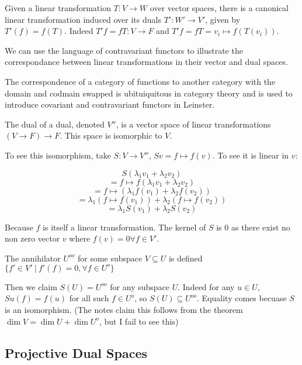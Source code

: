 \documentclass[10pt]{article}
\begin{document}
Given a linear transformation $T: V \to W$ over vector spaces, there is a
canonical linear transformation induced over its duals $T': W' \to V'$,
given by $T'(f) = f(T)$. Indeed $T'f = fT: V \to F$ and $T'f = fT = v_i \mapsto
f(T(v_i))$.

\begin{note}

We can use the language of contravariant functors to illustrate the
correspondance between linear transformations in their vector and dual spaces.


The correspondence of a category of functions to another category with the
domain and codmain swapped is ubituiquitous in category theory and is used to
introduce covariant and contravariant functors in Leinster. 


\begin{definition}
	The dual of a dual, denoted $V''$, is a vector space of linear
	transformations $(V \to F) \to F$. This space is isomorphic to $V$.
\end{definition}

To see this isomorphism, take $S: V \to V''$, $Sv = f \mapsto f(v)$.
To see it is linear in $v$:

\[S(\lambda_1 v_1 + \lambda_2 v_2)\] 
\[= f \mapsto f(\lambda_1 v_1 + \lambda_2 v_2)\]
\[= f \mapsto (\lambda_1 f(v_1) + \lambda_2 f(v_2))\]
\[= \lambda_1 (f \mapsto f(v_1)) + \lambda_2 (f \mapsto f(v_2))\]
\[= \lambda_1 S(v_1) + \lambda_2 S(v_2)\]

Because $f$ is itself a linear transformation. The kernel of $S$ is $0$ as
there exist no non zero vector $v$ where $f(v) = 0 \forall f \in V'$. 

\begin{definition}
	The annihilator $U^{oo}$ for some subspace $V \subseteq U$ is defined $\{ f'
	\in V' ~|~ f'(f) = 0, \forall f \in U^o \}$
\end{definition}

Then we claim $S(U) = U^{oo}$ for any subspace $U$. Indeed for any $u \in U$,
$Su(f) = f(u)$ for all such $f \in U^o$, so $S(U) \subseteq U^{oo}$.
Equality comes becuase $S$ is an isomorphism. (The notes claim this follows
from the theorem $\dim V = \dim U + \dim U^o$, but I fail to see this)

\subsection{Projective Dual Spaces}


\end{note}
\end{document}
